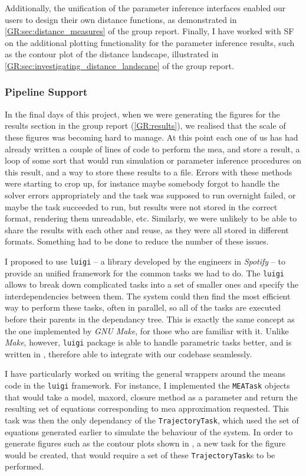 Additionally, the unification of the parameter inference interfaces enabled our users to design their own distance functions, as demonstrated in \autoref*{GR:sec:distance_measures} of the group report.
Finally, I have worked with SF on the additional plotting functionality for the parameter inference results, such as the contour plot of the distance landscape, illustrated in 
\autoref*{GR:sec:investigating_distance_landscape} of the group report.

\subsubsection{Pipeline Support}

In the final days of this project, when we were generating the figures for the results section in the group report (\autoref{GR:results}), we realised that the scale of these figures was becoming hard to manage. 
At this point each one of us has had already written a couple of lines of code to perform the \acrlong{mea}, and store a result, a loop of some sort that would run simulation or parameter inference procedures on this result, and a way to store these results to a file. 
Errors with these methods were starting to crop up, for instance maybe somebody forgot to handle the solver errors appropriately and the task was supposed to run overnight failed, or maybe the task succeeded to run, but results were not stored in the correct format, rendering them unreadable, etc.
Similarly, we were unlikely to be able to share the results with each other and reuse, as they were all stored in different formats.
Something had to be done to reduce the number of these issues.

I proposed to use \verb"luigi"\cite{_luigi_????} -- a \python{} library developed by the engineers in \emph{Spotify} -- to provide an unified framework for the common tasks we had to do. 
The \verb"luigi" allows to break down complicated tasks into a set of smaller ones and specify the interdependencies between them.
The system could then find the most efficient way to perform these  tasks, often in parallel, so all of the tasks are executed before their parents in the dependancy tree. 
This is exactly the same concept as the one implemented by \emph{GNU Make}\cite{gnumake}, for those who are familiar with it. Unlike \emph{Make}, however, \verb"luigi" package is able to handle parametric tasks better, and is written in \py{}, therefore able to integrate with our codebase seamlessly.

I have particularly worked on writing the general wrappers around the means code in the \verb"luigi" framework. 
For instance, I implemented the \verb"MEATask" objects that would take a model, \gls{maxord}, closure method as a parameter and return the resulting set of equations corresponding to \gls{mea} approximation requested. 
This task was then the only dependancy of the \verb"TrajectoryTask", which used the set of equations generated earlier to simulate the behaviour of the system. 
In order to generate figures such as the contour plots shown in , a new task for the figure would be created, that would require a set of these \verb"TrajectoryTask"s to be performed. 

